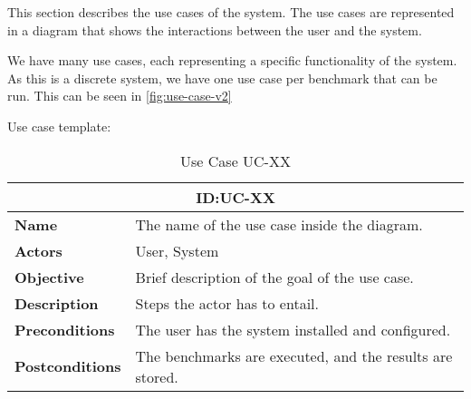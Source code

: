 This section describes the use cases of the system. The use cases are represented in a diagram that shows the interactions between the user and the system. 

We have many use cases, each representing a specific functionality of the system. As this is a discrete system, we have one use case per benchmark that can be run. This can be seen in \autoref{fig:use-case-v2}



Use case template:

\begin{table}[H]
    \centering
    \begin{tabular}{l p{10cm}}
        \toprule
        \multicolumn{2}{c}{\textbf{ID:\@ UC-XX}} \\
        \toprule
        \textbf{Name}               &  The name of the use case inside the diagram. \\
        \textbf{Actors}             &  User, System \\
        \textbf{Objective}          &  Brief description of the goal of the use case. \\
        \textbf{Description}        &  Steps the actor has to entail. \\
        \textbf{Preconditions}      &  The user has the system installed and configured. \\
        \textbf{Postconditions}     &  The benchmarks are executed, and the results are stored. \\
    \end{tabular}
    \caption{Use Case UC-XX}\label{tab:uc-xx}
\end{table}

